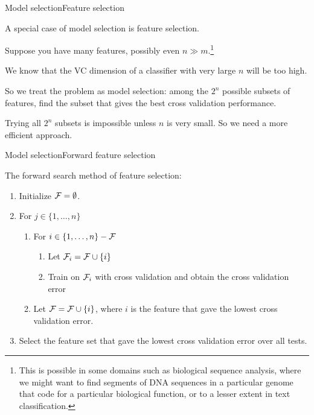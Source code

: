 \documentclass{beamer}
\begin{document}
\begin{frame}{Model selection}{Feature selection}

  A special case of model selection is \alert{feature selection}.

  \medskip

  Suppose you have many features, possibly even $n \gg
  m$.\footnote{This is possible in some domains such as biological
    sequence analysis, where we might want to find segments of DNA
    sequences in a particular genome that code for a particular
    biological function, or to a lesser extent in text
    classification.}

  \medskip

  We know that the VC dimension of a classifier with very large $n$
  will be too high.

  \medskip

  So we treat the problem as model selection: among the $2^n$ possible
  subsets of features, \alert{find the subset that gives the best cross
  validation performance}.

  \medskip

  Trying all $2^n$ subsets is impossible unless $n$ is very small. So
  we need a more efficient approach.
  
\end{frame}


\begin{frame}{Model selection}{Forward feature selection}

  The \alert{forward search} method of feature selection:
  \begin{enumerate}
  \item Initialize ${\cal F} = \emptyset$.
  \item For $j \in \{ 1, \dots, n \}$
    \begin{enumerate}
    \item For $i \in \{ 1, \ldots, n \} - {\cal F}$
      \begin{enumerate}
      \item Let ${\cal F}_i = {\cal F} \cup \{ i \}$
      \item Train on ${\cal F}_i$ with cross validation and obtain the
        cross validation error
      \end{enumerate}
    \item Let ${\cal F} = {\cal F} \cup \{ i \}$, where $i$ is the
      feature that gave the lowest cross validation error.
    \end{enumerate}
    \item Select the feature set that gave the lowest cross validation error
    over all tests.
  \end{enumerate}

\end{frame}
\end{document}

